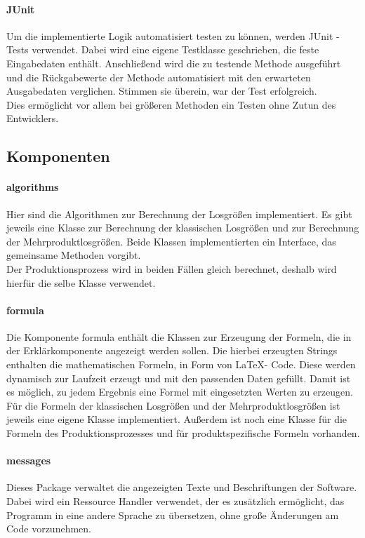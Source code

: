 \documentclass[12pt,a4paper, listof=entryprefix, bibliography=totocnumbered,toc=listofnumbered,lof=listofnumbered]{scrartcl}
\begin{document}
\paragraph{JUnit}
Um die implementierte Logik automatisiert testen zu können, werden JUnit - Tests verwendet. Dabei wird eine eigene Testklasse geschrieben, die feste Eingabedaten enthält. Anschließend wird die zu testende Methode ausgeführt und die Rückgabewerte der Methode automatisiert mit den erwarteten Ausgabedaten verglichen. Stimmen sie überein, war der Test erfolgreich.
\\
Dies ermöglicht vor allem bei größeren Methoden ein Testen ohne Zutun des Entwicklers.

\subsection{Komponenten}
\paragraph{algorithms}
Hier sind die Algorithmen zur Berechnung der Losgrößen implementiert. Es gibt jeweils eine Klasse zur Berechnung der klassischen Losgrößen und zur Berechnung der Mehrproduktlosgrößen. Beide Klassen implementierten ein Interface, das gemeinsame Methoden vorgibt. 
\\
Der Produktionsprozess wird in beiden Fällen gleich berechnet, deshalb wird hierfür die selbe Klasse verwendet.
\paragraph{formula}
Die Komponente formula enthält die Klassen zur Erzeugung der Formeln, die in der Erklärkomponente angezeigt werden sollen. Die hierbei erzeugten Strings enthalten die mathematischen Formeln, in Form von \LaTeX - Code. Diese werden dynamisch zur Laufzeit erzeugt und mit den passenden Daten gefüllt. Damit ist es möglich, zu jedem Ergebnis eine Formel mit eingesetzten Werten zu erzeugen.
\\
Für die Formeln der klassischen Losgrößen und der Mehrproduktlosgrößen ist jeweils eine eigene Klasse implementiert. Außerdem ist noch eine Klasse für die Formeln des Produktionsprozesses und für produktspezifische Formeln vorhanden.
\paragraph{messages}
Dieses Package verwaltet die angezeigten Texte und Beschriftungen der Software. Dabei wird ein Ressource Handler verwendet, der es zusätzlich ermöglicht, das Programm in eine andere Sprache zu übersetzen, ohne große Änderungen am Code vorzunehmen.
\end{document}
